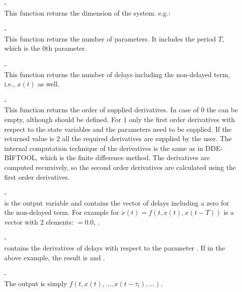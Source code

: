 \documentclass[10pt,a4paper]{ddedoc}
\begin{document}
\begin{itemize}
  \item[-]  \\ 
  This function returns the dimension of the
  system. e.g.: 
  
  \item[-]  \\ 
  This function returns the number of parameters. It
  includes the period $T$, which is the 0th parameter.
  
  \item[-]  \\ 
  This function returns the number of delays including the non-delayed term, i.e., $x ( t )$ as well.
  
  \item[-]  \\ 
  This function returns the order of supplied derivatives. In case of $0$ the  can be empty, although should be defined. For $1$ only the first order derivatives with respect to the state variables and the parameters need to be supplied. If the returned value is $2$ all the required derivatives are supplied by the user. The internal computation technique of the derivatives is the same as in DDE-BIFTOOL, which is the finite difference method. The derivatives are computed recursively, so the second order derivatives are calculated using the first order derivatives.
  
  \item[-]  \\
   is the output variable and contains the vector of delays
  including a zero for the non-delayed term. For example for $\dot{x} ( t ) =
  f ( t, x ( t ), x ( t - T ) )$  is a vector with 2 elements:
  $=0.0$, .
  
  \item[-]  \\
   contains the derivatives of delays with respect to the parameter
  . If  in the above example, the result is
   and .
  
  \item[-]  \\ 
  The output  is simply $f ( t, x ( t ), \ldots, x ( t - \tau_i ), \ldots )$.
  

\end{itemize}
\end{document}
